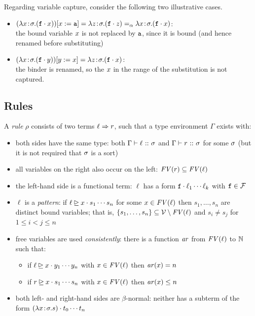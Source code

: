 \begin{example}
Regarding variable capture, consider the following two illustrative cases.

\begin{itemize}
\item $(\lambda x\!:\!\sigma.(\mathtt{f} \cdot x))[x:=\mathtt{a}] =
  \lambda z\!:\!\sigma.(\mathtt{f} \cdot z) =_\alpha
  \lambda x\!:\!\sigma.(\mathtt{f} \cdot x)$: \\
  the bound variable $x$ is not replaced by $\mathtt{a}$, since it is bound
  (and hence renamed before substituting)
\item $(\lambda x\!:\!\sigma.(\mathtt{f} \cdot y))[y:=x] =
  \lambda z\!:\!\sigma.(\mathtt{f} \cdot x)$: \\
  the binder is renamed, so the $x$ in the range of the substitution is not captured.
\end{itemize}
\end{example}

\subsection{Rules}

A \emph{rule} $\rho$ consists of two terms $\ell \Rightarrow r$, such that a type environment
$\Gamma$ exists with:

\begin{itemize}
\item both sides have the same type: both $\Gamma \vdash \ell \ \mathtt{::}\  \sigma$ and $\Gamma \vdash
  r \ \mathtt{::}\  \sigma$ for some $\sigma$ (but it is not required that $\sigma$ is a sort)
\item all variables on the right also occur on the left: $\mathit{FV}(r) \subseteq \mathit{FV}(\ell)$
\item the left-hand side is a functional term: $\ell$ has a form $\mathtt{f} \cdot \ell_1 \cdots \ell_k$
  with $\mathtt{f} \in \mathcal{F}$
\item $\ell$ is a \emph{pattern}: if $\ell \unrhd x \cdot s_1 \cdots s_n$ for some
  $x \in \mathit{FV}(\ell)$ then $s_1,\dots,s_n$ are distinct bound variables; that is,
  $\{s_1,\dots,s_n\} \subseteq \mathcal{V} \setminus \mathit{FV}(\ell)$ and $s_i \neq s_j$ for
  $1 \leq i < j \leq n$
\item free variables are used \emph{consistently}: there is a function $\mathit{ar}$ from $\mathit{FV}(\ell)$
  to $\mathbb{N}$ such that:
  \begin{itemize}
  \item if $\ell \unrhd x \cdot y_1 \cdots y_n$ with $x \in \mathit{FV}(\ell)$ then
    $\mathit{ar}(x) = n$
  \item if $r \unrhd x \cdot s_1 \cdots s_n$ with $x \in \mathit{FV}(\ell)$ then
    $\mathit{ar}(x) \leq n$
  \end{itemize}
\item both left- and right-hand sides are $\beta$-normal: neither has a subterm of the form
  $(\lambda x\!:\!\sigma.s) \cdot t_0 \cdots t_n$
\end{itemize}

